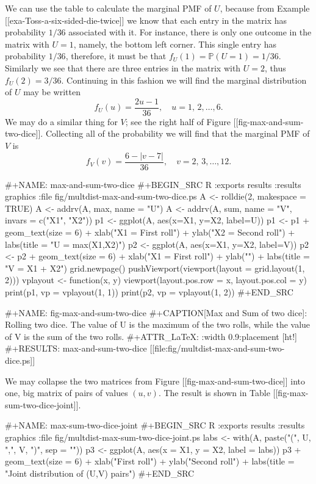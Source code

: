 We can use the table to calculate the marginal PMF of \(U\), because
from Example [[exa-Toss-a-six-sided-die-twice]] we know that each entry in
the matrix has probability \(1/36\) associated with it. For instance,
there is only one outcome in the matrix with \(U=1\), namely, the
bottom left corner. This single entry has probability \(1/36\),
therefore, it must be that
\(f_{U}(1)=\mathbb{P}(U=1)=1/36\). Similarly we see that there are
three entries in the matrix with \(U=2\), thus
\(f_{U}(2)=3/36\). Continuing in this fashion we will find the
marginal distribution of \(U\) may be written
\begin{equation}
f_{U}(u)=\frac{2u-1}{36},\quad u=1,\,2,\ldots,6.
\end{equation}
We may do a similar thing for \(V\); see the right half of Figure
[[fig-max-and-sum-two-dice]]. Collecting all of the probability we will find that
the marginal PMF of \(V\) is
\begin{equation}
f_{V}(v)=\frac{6-|v-7|}{36},\quad v=2,\,3,\ldots,12.
\end{equation}

#+NAME: max-and-sum-two-dice
#+BEGIN_SRC R :exports results :results graphics :file fig/multdist-max-and-sum-two-dice.ps
A <- rolldie(2, makespace = TRUE)
A <- addrv(A, max, name = "U")
A <- addrv(A, sum, name = "V", invars = c("X1", "X2"))
p1 <- ggplot(A, aes(x=X1, y=X2, label=U))
p1 <- p1 + geom_text(size = 6) + xlab("X1 = First roll") + 
      ylab("X2 = Second roll") + labs(title = "U = max(X1,X2)")
p2 <- ggplot(A, aes(x=X1, y=X2, label=V))
p2 <- p2 + geom_text(size = 6) + xlab("X1 = First roll") + 
      ylab("") + labs(title = "V = X1 + X2")
grid.newpage()
pushViewport(viewport(layout = grid.layout(1, 2)))
vplayout <- function(x, y) viewport(layout.pos.row = x, layout.pos.col = y)
print(p1, vp = vplayout(1, 1))
print(p2, vp = vplayout(1, 2))
#+END_SRC

#+NAME: fig-max-and-sum-two-dice
#+CAPTION[Max and Sum of two dice]: \small Rolling two dice. The value of U is the maximum of the two rolls, while the value of V is the sum of the two rolls.
#+ATTR_LaTeX: :width 0.9\textwidth :placement [ht!]
#+RESULTS: max-and-sum-two-dice
[[file:fig/multdist-max-and-sum-two-dice.ps]]

We may collapse the two matrices from Figure [[fig-max-and-sum-two-dice]] into
one, big matrix of pairs of values \((u,v)\). The result is shown in
Table [[fig-max-sum-two-dice-joint]].

#+NAME: max-sum-two-dice-joint
#+BEGIN_SRC R :exports results :results graphics :file fig/multdist-max-sum-two-dice-joint.ps
labs <- with(A, paste("(", U, ",", V, ")", sep = ""))
p3 <- ggplot(A, aes(x = X1, y = X2, label = labs))
p3 + geom_text(size = 6) + xlab("First roll") + ylab("Second roll") + 
  labs(title = "Joint distribution of (U,V) pairs")
#+END_SRC

